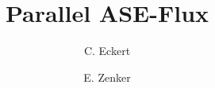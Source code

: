 \documentclass[3p,twocolumn]{elsarticle}
\begin{document}
\title{Parallel ASE-Flux}

\author[hzdr]{C. Eckert}

\author[hzdr]{E. Zenker}

\address[hzdr]{
  Institute of Radiation Physics, 
  Helmholtz-Zentrum Dresden-Rossendorf e. V.,
  Bautzner Landstraße 400,
  01328 Dresden,  
  Germany
}




\maketitle




		


\end{document}
